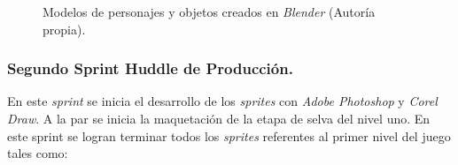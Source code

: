\begin{figure}[h]
          \centering
   
     
        
        
          \caption{Modelos de personajes y objetos creados en \textit{Blender} (Autoría propia).}
          \label{fig:Modelos3D}
\end{figure}

\subsubsection{Segundo Sprint Huddle de Producción.}
En este \textit{sprint} se inicia el desarrollo de los \textit{sprites}
con \textit{Adobe Photoshop} y \textit{Corel Draw}. A la par se inicia la
maquetación de la etapa de selva del nivel uno. En este sprint se logran
terminar todos los \textit{sprites} referentes al primer nivel del juego
tales como:

